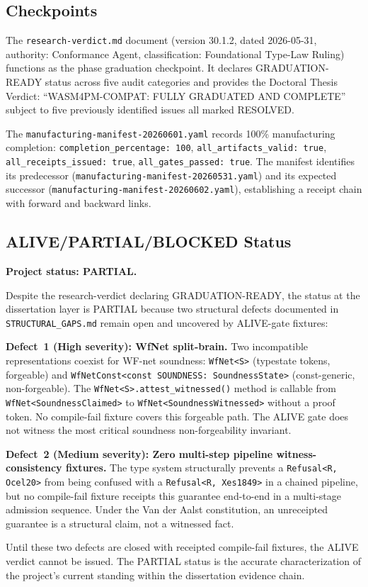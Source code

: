 \subsection{Checkpoints}
\label{sec:sources-wasm4pm-compat-evidence-checkpoints}

The \texttt{research-verdict.md} document (version 30.1.2, dated 2026-05-31, authority:
Conformance Agent, classification: Foundational Type-Law Ruling) functions as the
phase graduation checkpoint. It declares GRADUATION-READY status across five audit
categories and provides the Doctoral Thesis Verdict: ``WASM4PM-COMPAT: FULLY GRADUATED
AND COMPLETE'' subject to five previously identified issues all marked RESOLVED.

The \texttt{manufacturing-manifest-20260601.yaml} records 100\% manufacturing completion:
\texttt{completion\_percentage: 100}, \texttt{all\_artifacts\_valid: true},
\texttt{all\_receipts\_issued: true}, \texttt{all\_gates\_passed: true}. The manifest
identifies its predecessor (\texttt{manufacturing-manifest-20260531.yaml}) and its
expected successor (\texttt{manufacturing-manifest-20260602.yaml}), establishing a
receipt chain with forward and backward links.

\subsection{ALIVE/PARTIAL/BLOCKED Status}
\label{sec:sources-wasm4pm-compat-evidence-status}

\textbf{Project status: PARTIAL.}

Despite the research-verdict declaring GRADUATION-READY, the status at the dissertation
layer is PARTIAL because two structural defects documented in \texttt{STRUCTURAL\_GAPS.md}
remain open and uncovered by ALIVE-gate fixtures:

\textbf{Defect~1 (High severity): WfNet split-brain.} Two incompatible representations
coexist for WF-net soundness: \texttt{WfNet<S>} (typestate tokens, forgeable) and
\texttt{WfNetConst<const SOUNDNESS: SoundnessState>} (const-generic, non-forgeable). The
\texttt{WfNet<S>.attest\_witnessed()} method is callable from \texttt{WfNet<SoundnessClaimed>}
to \texttt{WfNet<SoundnessWitnessed>} without a proof token. No compile-fail fixture
covers this forgeable path. The ALIVE gate does not witness the most critical soundness
non-forgeability invariant.

\textbf{Defect~2 (Medium severity): Zero multi-step pipeline witness-consistency fixtures.}
The type system structurally prevents a \texttt{Refusal<R, Ocel20>} from being confused
with a \texttt{Refusal<R, Xes1849>} in a chained pipeline, but no compile-fail fixture
receipts this guarantee end-to-end in a multi-stage admission sequence. Under the Van der
Aalst constitution, an unreceipted guarantee is a structural claim, not a witnessed fact.

Until these two defects are closed with receipted compile-fail fixtures, the ALIVE verdict
cannot be issued. The PARTIAL status is the accurate characterization of the project's
current standing within the dissertation evidence chain.
